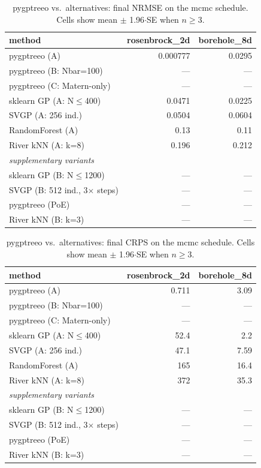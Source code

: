 
\begin{table}[h]
\centering
\caption{pygptreeo vs.\ alternatives: final NRMSE on the mcmc schedule. Cells show mean $\pm$ 1.96$\cdot$SE when $n\geq 3$.}
\begin{tabular}{lrr}
\toprule
method & rosenbrock\_2d & borehole\_8d \\
\midrule
pygptreeo (A) & 0.000777 & 0.0295 \\
pygptreeo (B: Nbar=100) & --- & --- \\
pygptreeo (C: Matern-only) & --- & --- \\
sklearn GP (A: N$\leq$400) & 0.0471 & 0.0225 \\
SVGP (A: 256 ind.) & 0.0504 & 0.0604 \\
RandomForest (A) & 0.13 & 0.11 \\
River kNN (A: k=8) & 0.196 & 0.212 \\
\midrule
\multicolumn{3}{l}{\textit{supplementary variants}} \\
sklearn GP (B: N$\leq$1200) & --- & --- \\
SVGP (B: 512 ind., 3$\times$ steps) & --- & --- \\
pygptreeo (PoE) & --- & --- \\
River kNN (B: k=3) & --- & --- \\
\bottomrule
\end{tabular}
\end{table}

\begin{table}[h]
\centering
\caption{pygptreeo vs.\ alternatives: final CRPS on the mcmc schedule. Cells show mean $\pm$ 1.96$\cdot$SE when $n\geq 3$.}
\begin{tabular}{lrr}
\toprule
method & rosenbrock\_2d & borehole\_8d \\
\midrule
pygptreeo (A) & 0.711 & 3.09 \\
pygptreeo (B: Nbar=100) & --- & --- \\
pygptreeo (C: Matern-only) & --- & --- \\
sklearn GP (A: N$\leq$400) & 52.4 & 2.2 \\
SVGP (A: 256 ind.) & 47.1 & 7.59 \\
RandomForest (A) & 165 & 16.4 \\
River kNN (A: k=8) & 372 & 35.3 \\
\midrule
\multicolumn{3}{l}{\textit{supplementary variants}} \\
sklearn GP (B: N$\leq$1200) & --- & --- \\
SVGP (B: 512 ind., 3$\times$ steps) & --- & --- \\
pygptreeo (PoE) & --- & --- \\
River kNN (B: k=3) & --- & --- \\
\bottomrule
\end{tabular}
\end{table}

